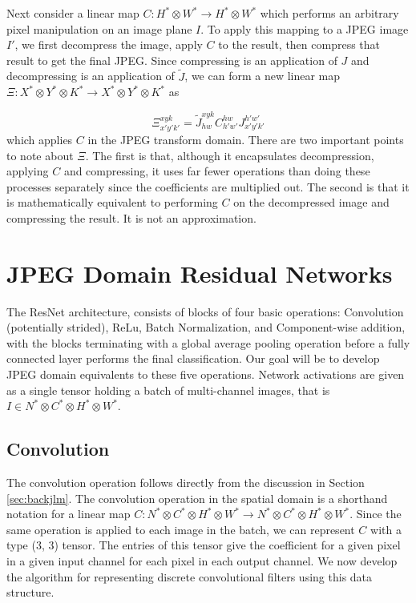 \documentclass[10pt,twocolumn,letterpaper]{article}
\begin{document}
Next consider a linear map $C: H^* \otimes W^* \rightarrow H^* \otimes W^*$ which performs an arbitrary pixel manipulation on an image plane $I$. To apply this mapping to a JPEG image $I'$, we first decompress the image, apply $C$ to the result, then compress that result to get the final JPEG. Since compressing is an application of $J$ and decompressing is an application of $\widetilde{J}$, we can form a new linear map $\Xi: X^* \otimes Y^* \otimes K^* \rightarrow X^* \otimes Y^* \otimes K^*$ as

\begin{equation}
\label{eq:stoj}
    \Xi^{xyk}_{x'y'k'} = \widetilde{J}^{xyk}_{hw}C^{hw}_{h'w'}J^{h'w'}_{x'y'k'}
\end{equation}
which applies $C$ in the JPEG transform domain. There are two important points to note about $\Xi$. The first is that, although it encapsulates decompression, applying $C$ and compressing, it uses far fewer operations than doing these processes separately since the coefficients are multiplied out. The second is that it is mathematically equivalent to performing $C$ on the decompressed image and compressing the result. It is not an approximation.\section{JPEG Domain Residual Networks}

The ResNet architecture, consists of blocks of four basic operations: Convolution (potentially strided), ReLu, Batch Normalization, and Component-wise addition, with the blocks terminating with a global average pooling operation \cite{he2016deep} before a fully connected layer performs the final classification. Our goal will be to develop JPEG domain equivalents to these five operations. Network activations are given as a single tensor holding a batch of multi-channel images, that is $I \in N^* \otimes C^* \otimes H^* \otimes W^*$.

\subsection{Convolution}

The convolution operation follows directly from the discussion in Section \ref{sec:backjlm}. The convolution operation in the spatial domain is a shorthand notation for a linear map $C: N^* \otimes C^* \otimes H^* \otimes W^* \rightarrow N^* \otimes C^* \otimes H^* \otimes W^*$. Since the same operation is applied to each image in the batch, we can represent $C$ with a type (3, 3) tensor. The entries of this tensor give the coefficient for a given pixel in a given input channel for each pixel in each output channel. We now develop the algorithm for representing discrete convolutional filters using this data structure.
\end{document}
